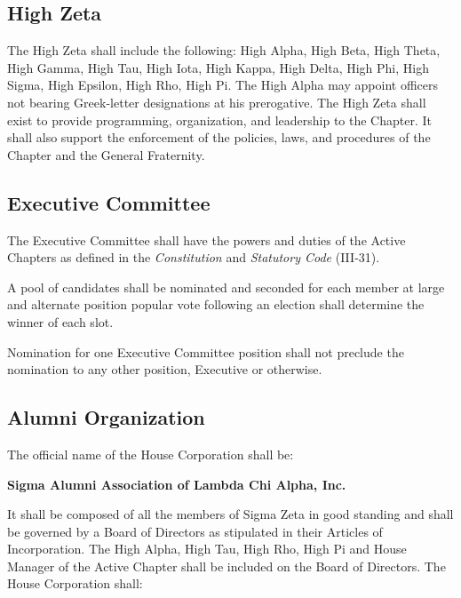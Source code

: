 \documentclass{article}
\begin{document}
\subsection{High Zeta}

The High Zeta shall include the following: High Alpha, High Beta, High Theta,
High Gamma, High Tau, High Iota, High Kappa, High Delta, High Phi, High Sigma,
High Epsilon, High Rho, High Pi. The High Alpha may appoint officers not bearing
Greek-letter designations at his prerogative. The High Zeta shall exist to
provide programming, organization, and leadership to the Chapter. It shall also
support the enforcement of the policies, laws, and procedures of the Chapter and
the General Fraternity.

\subsection{Executive Committee}

The Executive Committee shall have the powers and duties of the Active Chapters
as defined in the \emph{Constitution} and \emph{Statutory Code} (III‑31).

\begin{subsubsectionList}
  \item A pool of candidates shall be nominated and seconded for each member at
  large and alternate position popular vote following an election shall
  determine the winner of each slot.

  \item Nomination for one Executive Committee position shall not preclude the
  nomination to any other position, Executive or otherwise.
\end{subsubsectionList}

\subsection{Alumni Organization}

The official name of the House Corporation shall be:

\vspace*{-\baselineskip}
{\centering \textbf{Sigma Alumni Association of Lambda Chi Alpha, Inc.}\par}

It shall be composed of all the members of Sigma Zeta in good standing and shall
be governed by a Board of Directors as stipulated in their Articles of
Incorporation. The High Alpha, High Tau, High Rho, High Pi and House Manager of
the Active Chapter shall be included on the Board of Directors. The House
Corporation shall:
\end{document}

